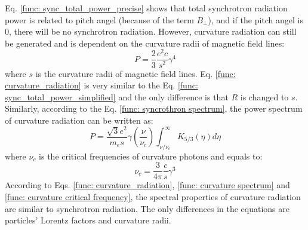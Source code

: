 \documentclass[12pt]{report}
\begin{document}
          Eq. \ref{func: sync_total_power_precise} shows that total synchrotron radiation 
          power is related to pitch angel (because of the term $B_\perp$), and if the 
          pitch angel is $0$, there will be no synchrotron radiation. However, curvature 
          radiation can still be generated and is dependent on the curvature radii of 
          magnetic field lines:
          \begin{equation}
            \label{func: curvature_radiation}
            P = \frac{2}{3}\frac{e^2c}{s^2}\gamma^4
          \end{equation}
          where $s$ is the curvature radii of magnetic field lines. 
          Eq. \ref{func: curvature_radiation} is very similar to the Eq. 
          \ref{func: sync_total_power_simplified} and the only difference is that 
          $R$ is changed to $s$. Similarly, according to the Eq. 
          \ref{func: syncrothron spectrum}, the power spectrum of curvature radiation can 
          be written as:
          \begin{equation}
            \label{func: curvature spectrum}
            P = \frac{\sqrt{3}e^2}{m_es}\gamma \left(\frac{\nu}{\nu_c}\right) \int_{\nu / \nu_c}^{\infty} K_{5/3}\left(\eta \right)d\eta
          \end{equation}
          where $\nu_c$ is the critical frequencies of curvature photons and equals to:
          \begin{equation}
            \label{func: curvature critical frequency}
            \nu_c = \frac{3}{4\pi}\frac{c}{s}\gamma^3
          \end{equation}
          According to Eqs. \ref{func: curvature_radiation}, \ref{func: curvature spectrum} 
          and \ref{func: curvature critical frequency}, the spectral properties of curvature 
          radiation are similar to synchrotron radiation. The only differences in the 
          equations are particles' Lorentz factors and curvature radii. 
\end{document}
